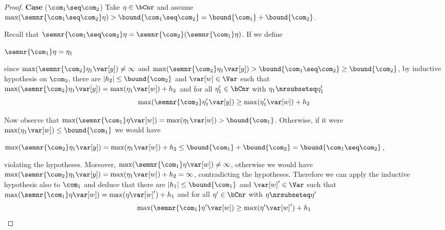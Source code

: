 \begin{proof}
  
  \medskip
  
  \noindent
  \textbf{Case} (\(\com_1 \seq \com_2\))
  Take \(\eta \in \bCnr\) and assume
  \(\max(\semnr{\com_1 \seq \com_2}\eta) > \bound{\com_1 \seq \com_2} =
  \bound{\com_1} + \bound{\com_2}\).
  
  Recall that
  \(\semnr{\com_1 \seq \com_2} \eta = \semnr{\com_2}(\semnr{\com_1}\eta)\).
  If we define
  \begin{center}
    \(\semnr{\com_1} \eta = \eta_1\)
  \end{center}
  since \(\max(\semnr{\com_2} \eta_1 \var[y]) \neq \infty\) and
  \(\max(\semnr{\com_2} \eta_1 \var[y]) > \bound{\com_1 \seq \com_2}
  \geq \bound{\com_2}\), by inductive hypothesis on \(\com_2\), there
  are \(|h_2| \leq \bound{\com_2}\) and \(\var[w] \in \Var\) such that
  \(\max(\semnr{\com_2} \eta_1 \var[y]) = \max(\eta_1 \var[w]) + h_2\)
  and for all \(\eta_1' \in \bCnr\) with
  \(\eta_1 \nrsubseteq \eta_1'\)
  \begin{equation}
    \label{eq:seq2nr}
    \max(\semnr{\com_2} \eta_1' \var[y]) \geq \max(\eta_1' \var[w]) + h_2
  \end{equation}
  
  Now observe that
  \(\max(\semnr{\com_1}\eta \var[w]) = \max(\eta_1 \var[w]) >
  \bound{\com_1}\). Otherwise, if it were \(\max(\eta_1 \var[w]) \leq
  \bound{\com_1}\) we would have
  \begin{center}
    \(\max(\semnr{\com_2}\eta_1 \var[y]) = \max(\eta_1 \var[w]) + h_2 \leq
    \bound{\com_1} + \bound{\com_2} = \bound{\com_1 \seq \com_2}\),
  \end{center}
  violating the hypotheses. Moreover,
  \(\max(\semnr{\com_1}\eta \var[w]) \neq \infty\), otherwise we would
  have
  \(\max(\semnr{\com_2} \eta_1 \var[y]) = \max(\eta_1 \var[w]) + h_2 =
  \infty\), contradicting the hypotheses.  Therefore we can apply the
  inductive hypothesis also to \(\com_1\) and deduce that there are
  \(|h_1| \leq \bound{\com_1}\) and \(\var[w]' \in \Var\) such that
  \(\max(\semnr{\com_1} \eta \var[w]) = \max(\eta \var[w]') + h_1\)
  and for all \(\eta' \in \bCnr\) with \(\eta \nrsubseteq \eta'\)
  \begin{equation}
    \label{eq:seq1nr}
    \max(\semnr{\com_1} \eta' \var[w]) \geq \max(\eta' \var[w]') + h_1
  \end{equation}


\end{proof}
